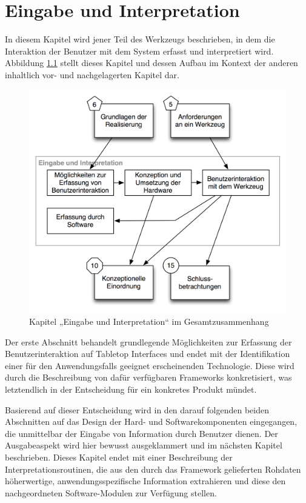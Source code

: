 
\chapter{Eingabe und Interpretation} %
\label{cha:input_&_interpretation}

In diesem Kapitel wird jener Teil des Werkzeugs beschrieben, in dem die Interaktion der Benutzer mit dem System erfasst und interpretiert wird. Abbildung \ref{fig:img_Kontextgrafiken_k7} stellt dieses Kapitel und dessen Aufbau im Kontext der anderen inhaltlich vor- und nachgelagerten Kapitel dar.

\begin{figure}[htbp]
	\centering
		\includegraphics[scale=0.6]{img/Kontextgrafiken/k7.png}
	\caption{Kapitel „Eingabe und Interpretation“ im Gesamtzusammenhang}
	\label{fig:img_Kontextgrafiken_k7}
\end{figure}

Der erste Abschnitt behandelt grundlegende Möglichkeiten zur Erfassung der Benutzerinteraktion auf Tabletop Interfaces und endet mit der Identifikation einer für den Anwendungsfalls geeignet erscheinenden Technologie. Diese wird durch die Beschreibung von dafür verfügbaren Frameworks konkretisiert, was letztendlich in der Entscheidung für ein konkretes Produkt mündet.

Basierend auf dieser Entscheidung wird in den darauf folgenden beiden Abschnitten auf das Design der Hard- und Softwarekomponenten eingegangen, die unmittelbar der Eingabe von Information durch Benutzer dienen. Der Ausgabeaspekt wird hier bewusst ausgeklammert und im nächsten Kapitel beschrieben. Dieses Kapitel endet mit einer Beschreibung der Interpretationsroutinen, die aus den durch das Framework gelieferten Rohdaten höherwertige, anwendungsspezifische Information extrahieren und diese den nachgeordneten Software-Modulen zur Verfügung stellen.

